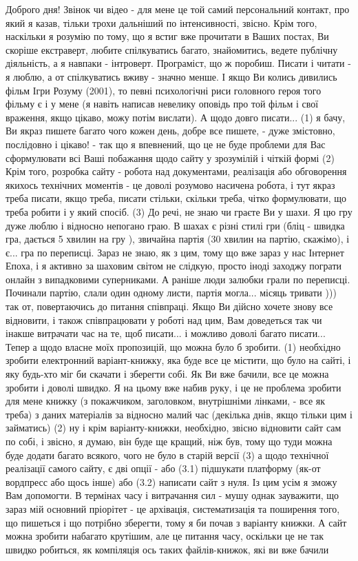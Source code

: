 Доброго дня! Звінок чи відео - для мене це той самий персональний контакт, про який я
казав, тільки трохи дальніший по інтенсивності, звісно. Крім того, наскільки я
розумію по тому, що я встиг вже прочитати в Ваших постах, Ви скоріше
екстраверт, любите спілкуватись багато, знайомитись, ведете публічну діяльність, 
а я навпаки - інтроверт. Програміст, що ж поробиш. Писати і читати
- я люблю, а от спілкуватись вживу - значно менше. І якщо Ви колись дивились
фільм Ігри Розуму (2001), то певні психологічні риси головного героя того фільму є і у мене (я навіть
написав невелику оповідь про той фільм і свої враження, якщо цікаво, можу потім
вислати). А щодо довго писати... (1) я бачу, Ви якраз пишете багато чого кожен
день, добре все пишете, - дуже змістовно, послідовно і цікаво! - так що я
впевнений, що це не буде проблеми для Вас сформулювати всі Ваші побажання щодо
сайту у зрозумілій і чіткій формі (2) Крім того, розробка сайту - робота над
документами, реалізація або обговорення якихось технічних моментів  - це доволі
розумово насичена робота, і тут якраз треба писати, якщо треба, писати стільки,
скільки треба, чітко формулювати, що треба робити і у який спосіб. (3) До речі,
не знаю чи граєте Ви у шахи. Я цю гру дуже люблю і відносно непогано граю. В
шахах є різні стилі гри (бліц - швидка гра, дається 5 хвилин на гру ), звичайна
партія (30 хвилин на партію, скажімо), і є... гра по переписці. Зараз не знаю,
як з цим, тому що вже зараз у нас Інтернет Епоха, і я активно за шаховим світом не слідкую,
просто іноді заходжу пограти онлайн з випадковими суперниками. А раніше люди залюбки грали
по переписці.  Починали партію, слали один одному листи, партія могла... місяць
тривати ))) так от, повертаючись до питання співпраці. Якщо Ви дійсно хочете
знову все відновити, і також співпрацювати у роботі над цим, Вам доведеться так
чи інакше витрачати час на те, щоб писати... і можливо доволі багато писати...
Тепер а щодо власне моїх пропозицій, що можна було б зробити. (1) необхідно
зробити електронний варіант-книжку, яка буде все це містити, що було на сайті,
і яку будь-хто міг би скачати і зберегти собі. Як Ви вже бачили, все це можна
зробити і доволі швидко. Я на цьому вже набив руку, і це не проблема зробити
для мене книжку (з покажчиком, заголовком, внутрішніми лінками, - все як
треба) з даних матеріалів за відносно малий час (декілька днів, якщо тільки цим
і займатись) (2) ну і крім варіанту-книжки, необхідно, звісно відновити сайт
сам по собі, і звісно, я думаю, він буде ще кращий, ніж був, тому що туди можна
буде додати багато всякого, чого не було в старій версії (3) а щодо технічної
реалізації самого сайту, є дві опції - або (3.1) підшукати платформу (як-от
вордпресс або щось інше) або (3.2) написати сайт з нуля. Із цим усім я зможу
Вам допомогти. В термінах часу і витрачання сил - мушу однак зауважити, що
зараз мій основний пріорітет - це архівація, систематизація та поширення того,
що пишеться і що потрібно зберегти, тому я би почав з варіанту книжки. А сайт
можна зробити набагато крутішим, але це питання часу, оскільки це не так швидко
робиться, як компіляція ось таких файлів-книжок, які ви вже бачили

